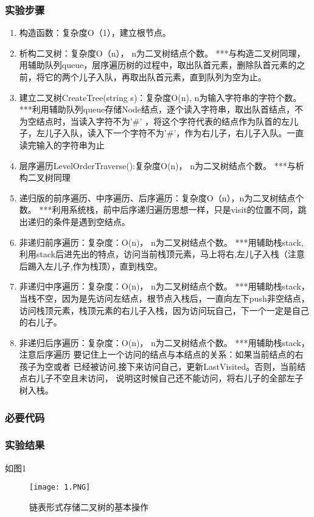 \subsubsection{实验步骤}
\begin{enumerate}
\item 构造函数：复杂度O（1），建立根节点。
\item 析构二叉树：复杂度O（n）， n为二叉树结点个数。      ***与构造二叉树同理，用辅助队列queue，层序遍历树的过程中，取出队首元素，删除队首元素的之前，将它的两个儿子入队，再取出队首元素，直到队列为空为止。
\item 建立二叉树CreateTree(string s)：复杂度O(n), n为输入字符串的字符个数。   ***利用辅助队列queue存储Node结点，逐个读入字符串，取出队首结点，不为空结点时，当读入字符不为'$\#$' ，将这个字符代表的结点作为队首的左儿子，左儿子入队，读入下一个字符不为'$\#$'，作为右儿子，右儿子入队。一直读完输入的字符串为止
\item 层序遍历LevelOrderTraverse():复杂度O(n)， n为二叉树结点个数。 ***与析构二叉树同理
\item 递归版的前序遍历、中序遍历、后序遍历：复杂度O（n），n为二叉树结点个数。            ***利用系统栈，前中后序递归遍历思想一样，只是visit的位置不同，跳出递归的条件是遇到空结点。
\item 非递归前序遍历：复杂度：O(n)， n为二叉树结点个数。          ***用辅助栈stack,利用stack后进先出的特点，访问当前栈顶元素，马上将右,左儿子入栈（注意后踢入左儿子,作为栈顶），直到栈空。
\item 非递归中序遍历：复杂度：O(n)， n为二叉树结点个数。          ***用辅助栈stack，当栈不空，因为是先访问左结点，根节点入栈后，一直向左下push非空结点，访问栈顶元素，栈顶元素的右儿子入栈，因为访问玩自己，下一个一定是自己的右儿子。
\item  非递归后序遍历：复杂度：O(n)， n为二叉树结点个数。          ***用辅助栈stack，注意后序遍历 要记住上一个访问的结点与本结点的关系：如果当前结点的右孩子为空或者 已经被访问,接下来访问自己，更新LastVisited。否则，当前结点右儿子不空且未访问， 说明这时候自己还不能访问，将右儿子的全部左子树入栈。 
\end{enumerate}
\subsubsection{必要代码}

\subsubsection{实验结果}如图1
	\begin{figure}[!bthp]
	\centering
        \texttt{[image: 1.PNG]}
        \caption{链表形式存储二叉树的基本操作}
      \end{figure}



